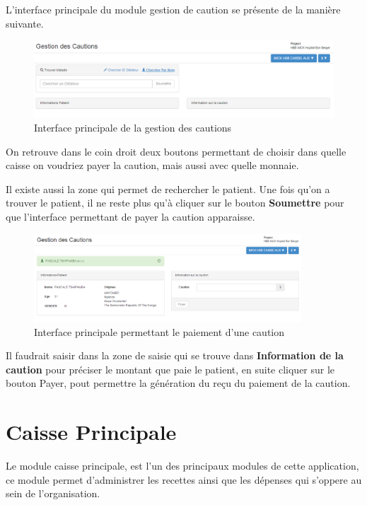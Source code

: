 \documentclass[12pt,a4paper]{report}
\begin{document}
L'interface principale du module gestion de caution se présente de la manière suivante.

\begin{figure}[h]
\begin{center}
\includegraphics[width=14cm]{pic/cautionInterface.png}
\end{center}
\caption{Interface principale de la gestion des cautions}
\label{Interface principale de la gestion des cautions}
\end{figure}

On retrouve dans le coin droit deux boutons permettant de choisir dans quelle caisse on voudriez payer la caution, mais aussi avec quelle monnaie. 

Il existe aussi la zone qui permet de rechercher le patient. Une fois qu'on a trouver le patient, il ne reste plus qu'à cliquer sur le bouton \textbf{Soumettre} pour que l'interface permettant de payer la caution apparaisse.

\begin{figure}[h]
\begin{center}
\includegraphics[width=10cm]{pic/formGestionCaution.png}
\end{center}
\caption{Interface principale permettant le paiement d'une caution}
\label{Interface principale permettant le paiement d'une caution}
\end{figure}

Il faudrait saisir dans la zone de saisie qui se trouve dans \textbf{Information de la caution} pour préciser le montant que paie le patient, en suite cliquer sur le bouton Payer, pout permettre la génération du reçu du paiement de la caution.


\newpage 
\section{Caisse Principale}
Le module caisse principale, est l'un des principaux modules de cette application, ce module permet d'administrer les recettes ainsi que les dépenses qui s'oppere au sein de l'organisation.
\end{document}
